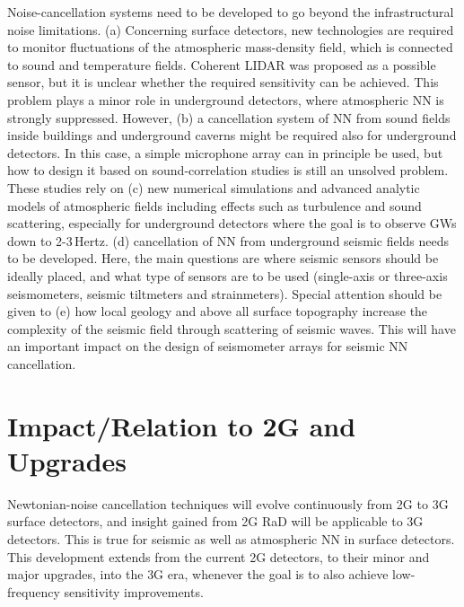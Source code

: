 Noise-cancellation systems need to be developed 
to go beyond the infrastructural noise limitations. (a) Concerning surface detectors, new technologies are required to monitor fluctuations of the atmospheric mass-density field, which is connected to sound and temperature fields. Coherent \ac{LIDAR} was proposed as a possible sensor, but it is unclear whether the required sensitivity can be achieved. This problem plays a minor role in underground detectors, where atmospheric \ac{NN} is strongly suppressed. However, (b) a cancellation system of \ac{NN} from sound fields inside buildings and underground caverns might be required also for underground detectors. In this case, a simple microphone array can in principle be used, but how to design it based on sound-correlation studies is still an unsolved problem. These studies rely on (c) new numerical simulations and advanced analytic models of atmospheric fields including effects such as turbulence and sound scattering, especially for underground detectors where the goal is to observe \acp{GW} down to 2-3\,Hertz. (d) cancellation of \ac{NN} from underground seismic fields needs to be developed. Here, the main questions are where seismic sensors should be ideally placed, and what type of sensors are to be used (single-axis or three-axis seismometers, seismic tiltmeters and strainmeters). Special attention should be given to (e) how local geology and above all surface topography increase the complexity of the seismic field through scattering of seismic waves. This will have an important impact on 
the design of seismometer arrays for seismic \ac{NN} cancellation.

\section{Impact/Relation to 2G and Upgrades}
Newtonian-noise cancellation techniques will evolve continuously from 2G to \ac{3G} surface detectors, and insight gained from 2G \ac{RaD} will be applicable to \ac{3G} detectors. This is true for seismic as well as atmospheric \ac{NN} in surface detectors. This development extends from the current 2G detectors, to their minor and major upgrades, into the \ac{3G} era, whenever the goal is to also achieve low-frequency sensitivity improvements. 

